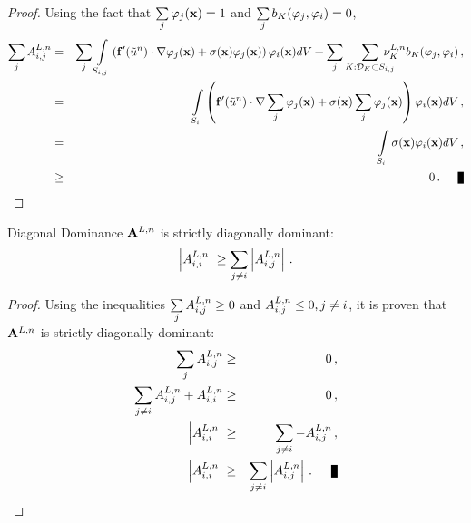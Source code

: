 \begin{proof}
Using the fact that $\sum\limits_j\varphi_j(\mathbf{x})=1$ and
$\sum\limits_j b_K(\varphi_j, \varphi_i)=0$,
\begin{eqnarray*}
   \sumj \ssmatrixletter^{L,\timeindex}\ij & = & \sumj \intSij
      \left(\mathbf{\consfluxletter}'(\approximatescalarsolution^\timeindex)
        \cdot\nabla\testfunction_j(\x) +
      \reactioncoef(\x)\testfunction_j(\x)\right)\testfunction_i(\x) d\volume +
      \sumj\sumKSij\mkern-20mu\lowordercellviscosity[\timeindex]\localviscbilinearform{\cell}{j}{i}
      \eqc\\
   & = & \intSi\left(
      \mathbf{\consfluxletter}'(\approximatescalarsolution^\timeindex)\cdot
      \nabla\sumj\testfunction_j(\x) +
      \reactioncoef(\x)\sumj\testfunction_j(\x)\right)
      \testfunction_i(\x) d\volume \eqc\\
   \label{eq:rowsum} & = & \intSi\reactioncoef(\x)\testfunction_i(\x) d\volume
     \eqc\\
   &\ge& 0 \eqp \qed
\end{eqnarray*}
\end{proof}
\begin{lemma}{Diagonal Dominance}
   $\loworderssmatrix[\timeindex]$ is strictly diagonally dominant:
   \[
     \left|A^{L,n}_{i,i}\right|
     \ge \sum\limits_{j\ne i} \left|A^{L,n}_{i,j}\right| \,.
   \]
\end{lemma}
\begin{proof}
Using the inequalities $\sum\limits_j A^{L,n}_{i,j} \ge 0$ and
$A^{L,n}_{i,j}\le 0, j\ne i$, it is proven that
$\loworderssmatrix[\timeindex]$ is strictly diagonally dominant:
\begin{eqnarray*}
  \sumj     \ssmatrixletter^{L,\timeindex}\ij       & \ge & 0 \eqc\\
  \sumjnoti \ssmatrixletter^{L,\timeindex}\ij
    + \ssmatrixletter^{L,\timeindex}_{i,i} & \ge & 0 \eqc\\
  \left|\ssmatrixletter^{L,\timeindex}_{i,i}\right| & \ge &
    \sumjnoti -\ssmatrixletter^{L,\timeindex}\ij
    \eqc\\
  \left|\ssmatrixletter^{L,\timeindex}_{i,i}\right| & \ge
    & \sumjnoti \left|\ssmatrixletter^{L,\timeindex}\ij\right| \eqp \qed
\end{eqnarray*}
\end{proof}
